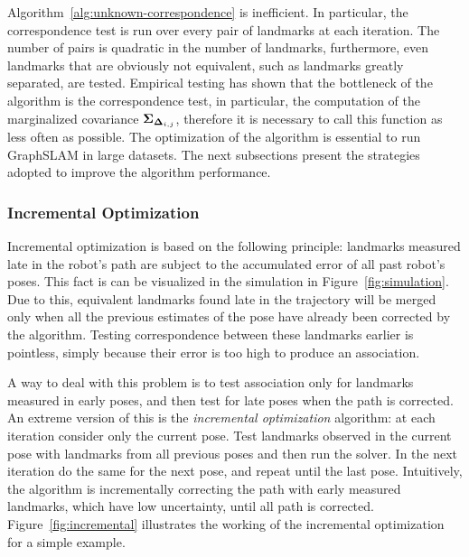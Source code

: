 Algorithm~\ref{alg:unknown-correspondence} is inefficient. In particular, the correspondence test is run over every pair of landmarks at each iteration. The number of pairs is quadratic in the number of landmarks, furthermore, even landmarks that are obviously not equivalent, such as landmarks greatly separated, are tested. Empirical testing has shown that the bottleneck of the algorithm is the correspondence test, in particular, the computation of the marginalized covariance $\boldsymbol{\Sigma}_{\boldsymbol{\Delta}_{i,j}}$, therefore it is necessary to call this function as less often as possible. The optimization of the algorithm is essential to run GraphSLAM in large datasets. The next subsections present the strategies adopted to improve the algorithm performance.

\subsubsection{Incremental Optimization}

Incremental optimization is based on the following principle: landmarks measured late in the robot's path are subject to the accumulated error of all past robot's poses. This fact is can be visualized in the simulation in Figure~\ref{fig:simulation}. Due to this, equivalent landmarks found late in the trajectory will be merged only when all the previous estimates of the pose have already been corrected by the algorithm. Testing correspondence between these landmarks earlier is pointless, simply because their error is too high to produce an association. 

A way to deal with this problem is to test association only for landmarks measured in early poses, and then test for late poses when the path is corrected. An extreme version of this is the \emph{incremental optimization} algorithm: at each iteration consider only the current pose. Test landmarks observed in the current pose with landmarks from all previous poses and then run the solver. In the next iteration do the same for the next pose, and repeat until the last pose. Intuitively, the algorithm is incrementally correcting the path with early measured landmarks, which have low uncertainty, until all path is corrected. Figure~\ref{fig:incremental} illustrates the working of the incremental optimization for a simple example.

